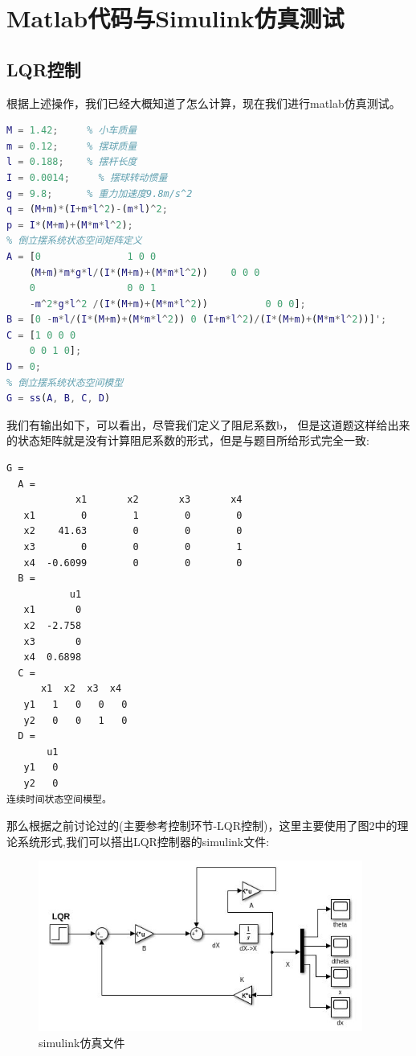 \documentclass{article}
\begin{document}
\section*{Matlab代码与Simulink仿真测试}
\subsection*{LQR控制}
根据上述操作，我们已经大概知道了怎么计算，现在我们进行matlab仿真测试。
\begin{lstlisting}[language=matlab,numbers=none]
% 倒立摆系统参数
M = 1.42;     % 小车质量
m = 0.12;     % 摆球质量
l = 0.188;    % 摆杆长度
I = 0.0014;     % 摆球转动惯量
g = 9.8;      % 重力加速度9.8m/s^2
q = (M+m)*(I+m*l^2)-(m*l)^2;
p = I*(M+m)+(M*m*l^2);
% 倒立摆系统状态空间矩阵定义
A = [0               1 0 0
    (M+m)*m*g*l/(I*(M+m)+(M*m*l^2))    0 0 0
    0                0 0 1
    -m^2*g*l^2 /(I*(M+m)+(M*m*l^2))          0 0 0];
B = [0 -m*l/(I*(M+m)+(M*m*l^2)) 0 (I+m*l^2)/(I*(M+m)+(M*m*l^2))]';
C = [1 0 0 0
    0 0 1 0];
D = 0;
% 倒立摆系统状态空间模型
G = ss(A, B, C, D)
\end{lstlisting}
我们有输出如下，可以看出，尽管我们定义了阻尼系数b，
但是这道题这样给出来的状态矩阵就是没有计算阻尼系数的形式，但是与题目所给形式完全一致:
\begin{lstlisting}[numbers=none]
G =
  A = 
            x1       x2       x3       x4
   x1        0        1        0        0
   x2    41.63        0        0        0
   x3        0        0        0        1
   x4  -0.6099        0        0        0
  B = 
           u1
   x1       0
   x2  -2.758
   x3       0
   x4  0.6898
  C = 
      x1  x2  x3  x4
   y1   1   0   0   0
   y2   0   0   1   0
  D = 
       u1
   y1   0 
   y2   0
连续时间状态空间模型。
\end{lstlisting}
那么根据之前讨论过的(主要参考控制环节-LQR控制)，这里主要使用了图2中的理论系统形式,我们可以搭出LQR控制器的simulink文件:
\begin{figure}[htbp]
    \centering
    \includegraphics[width=0.95\textwidth]{imgs/simulink_lqr.png}
    \caption{simulink仿真文件}    
\end{figure}
\end{document}
